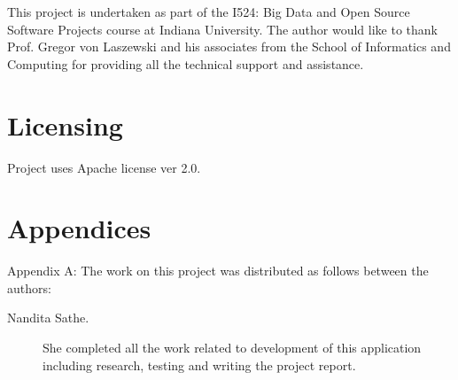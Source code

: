 \documentclass[9pt,twocolumn,twoside]{../../styles/osajnl}
\begin{document}
This project is undertaken as part of the I524: Big Data and Open Source Software Projects course at Indiana University. The author would like to thank Prof. Gregor von Laszewski and his associates from the School of Informatics and Computing for providing all the technical support and assistance.

\section {Licensing}

Project uses Apache license ver 2.0.




 
\newpage

\section{Appendices}

Appendix A: The work on this project was distributed as follows between the
authors:

\begin{description}

\item[Nandita Sathe.] She completed all the work related to development of this application including research, testing and writing the project report. 

\end{description}
\end{document}
